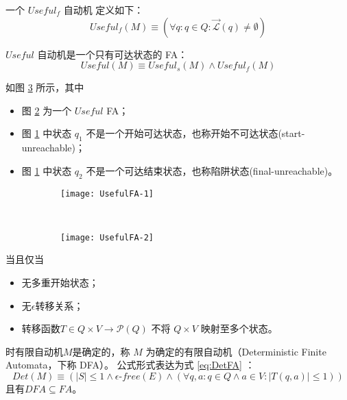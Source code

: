 \begin{definition}
    一个 $Useful_f$ 自动机 定义如下： 
    \[ Useful_f (M) \equiv ( \forall q:q \in Q : \overrightarrow{\mathcal{L}} (q) \not= \emptyset ) \]
\end{definition}

\begin{definition}
    $Useful$ 自动机是一个只有可达状态的 FA：
    \[ Useful (M) \equiv Useful_s (M) \land Useful_f (M) \]
\end{definition}

\begin{example}
    如图 \ref{fig:UsefulFA} 所示，其中
    \begin{itemize}
        \item 图 \ref{fig:UsefulFA-2} 为一个 $Useful$ FA；
        \item 图 \ref{fig:UsefulFA-1} 中状态 $q_1$ 不是一个开始可达状态，也称开始不可达状态(start-unreachable)；
        \item 图 \ref{fig:UsefulFA-1} 中状态 $q_2$ 不是一个可达结束状态，也称陷阱状态(final-unreachable)\cite{book1}。
    \end{itemize}
\end{example}

\begin{figure}[!htbp]
    \centering
    \begin{subfigure}[b]{0.45\textwidth}
        \texttt{[image: UsefulFA-1]}
        \caption{}
        \label{fig:UsefulFA-1}
    \end{subfigure}
    ~
    \begin{subfigure}[b]{0.45\textwidth}
        \texttt{[image: UsefulFA-2]}
        \caption{}
        \label{fig:UsefulFA-2}
    \end{subfigure}
    \caption{}
    \label{fig:UsefulFA}
\end{figure}

\begin{definition}
    当且仅当 
    \begin{itemize}
        \item 无多重开始状态；
        \item 无$\epsilon$转移关系；
        \item 转移函数$T \in Q \times V \longrightarrow \mathcal{P} (Q) $ 不将 $Q \times V$ 映射至多个状态。
    \end{itemize}
    时有限自动机$M$是确定的，称 $M$ 为确定的有限自动机（Deterministic Finite Automata，下称 DFA）。
    公式形式表达为式 \ref{eq:DetFA} ：
    \begin{equation}\label{eq:DetFA}
    Det(M) \equiv ( |S| \leq 1 \land \epsilon\mbox{-} free(E) \land ( \forall q,a:q \in Q \land a \in V : |T(q,a)| \leq 1 )) 
    \end{equation}
    且有$ DFA \subseteq FA$。
\end{definition}


